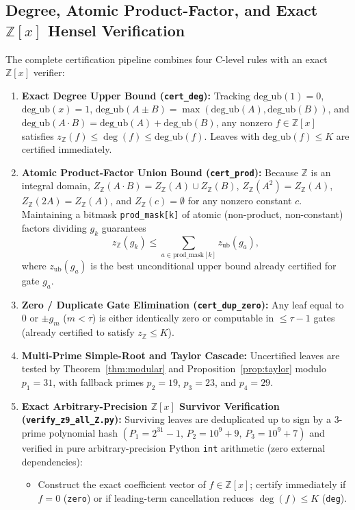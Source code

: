 \documentclass[11pt]{article}
\newcommand{\Z}{\mathbb{Z}}
\newcommand{\code}[1]{\texttt{#1}}
\newcommand{\zZ}{z_{\Z}}
\begin{document}
\subsection{Degree, Atomic Product-Factor, and Exact $\Z[x]$ Hensel Verification}
The complete certification pipeline combines four C-level rules with an exact $\Z[x]$ verifier:
\begin{enumerate}[label=(\arabic*),leftmargin=1.8em]
  \item \textbf{Exact Degree Upper Bound (\code{cert\_deg}):} Tracking $\mathrm{deg\_ub}(1) = 0$, $\mathrm{deg\_ub}(x) = 1$, $\mathrm{deg\_ub}(A \pm B) = \max(\mathrm{deg\_ub}(A), \mathrm{deg\_ub}(B))$, and $\mathrm{deg\_ub}(A \cdot B) = \mathrm{deg\_ub}(A) + \mathrm{deg\_ub}(B)$, any nonzero $f \in \Z[x]$ satisfies $\zZ(f) \le \deg(f) \le \mathrm{deg\_ub}(f)$. Leaves with $\mathrm{deg\_ub}(f) \le K$ are certified immediately.
  \item \textbf{Atomic Product-Factor Union Bound (\code{cert\_prod}):} Because $\Z$ is an integral domain, $Z_{\Z}(A \cdot B) = Z_{\Z}(A) \cup Z_{\Z}(B)$, $Z_{\Z}(A^2) = Z_{\Z}(A)$, $Z_{\Z}(2A) = Z_{\Z}(A)$, and $Z_{\Z}(c) = \emptyset$ for any nonzero constant $c$. Maintaining a bitmask \code{prod\_mask[k]} of atomic (non-product, non-constant) factors dividing $g_k$ guarantees
  \[
    \zZ(g_k) \le \sum_{a \in \mathrm{prod\_mask}[k]} z_{\mathrm{ub}}(g_a),
  \]
  where $z_{\mathrm{ub}}(g_a)$ is the best unconditional upper bound already certified for gate $g_a$.
  \item \textbf{Zero / Duplicate Gate Elimination (\code{cert\_dup\_zero}):} Any leaf equal to $0$ or $\pm g_m$ ($m < \tau$) is either identically zero or computable in $\le \tau - 1$ gates (already certified to satisfy $\zZ \le K$).
  \item \textbf{Multi-Prime Simple-Root and Taylor Cascade:} Uncertified leaves are tested by Theorem~\ref{thm:modular} and Proposition~\ref{prop:taylor} modulo $p_1 = 31$, with fallback primes $p_2 = 19$, $p_3 = 23$, and $p_4 = 29$.
  \item \textbf{Exact Arbitrary-Precision $\Z[x]$ Survivor Verification (\code{verify\_z9\_all\_Z.py}):} Surviving leaves are deduplicated up to sign by a $3$-prime polynomial hash $(P_1 = 2^{31}-1,\, P_2 = 10^9+9,\, P_3 = 10^9+7)$ and verified in pure arbitrary-precision Python \code{int} arithmetic (zero external dependencies):
  \begin{itemize}[leftmargin=1.5em]
    \item Construct the exact coefficient vector of $f \in \Z[x]$; certify immediately if $f = 0$ (\code{zero}) or if leading-term cancellation reduces $\deg(f) \le K$ (\code{deg}).

\end{itemize}
\end{enumerate}
\end{document}
